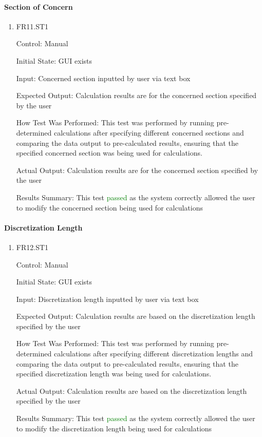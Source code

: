 \documentclass[12pt, titlepage]{article}
\begin{document}
\paragraph{Section of Concern}

\begin{enumerate}

  \item{FR11.ST1\\}

  Control: Manual
            
  Initial State: GUI exists
            
  Input: Concerned section inputted by user via text box
            
  Expected Output: Calculation results are for the concerned section specified by the user
            
  How Test Was Performed: This test was performed by running pre-determined calculations after specifying different concerned sections and comparing the data output to pre-calculated results, ensuring that the specified concerned section was being used for calculations.
					
  Actual Output: Calculation results are for the concerned section specified by the user

  Results Summary: This test \textcolor{green} {passed} as the system correctly allowed the user to modify the concerned section being used for calculations

 \end{enumerate}

\paragraph{Discretization Length}

\begin{enumerate}

  \item{FR12.ST1\\}

  Control: Manual
					
  Initial State: GUI exists
					
  Input: Discretization length inputted by user via text box
					
  Expected Output: Calculation results are based on the discretization length specified by the user

  How Test Was Performed: This test was performed by running pre-determined calculations after specifying different discretization lengths and comparing the data output to pre-calculated results, ensuring that the specified discretization length was being used for calculations. 

  Actual Output: Calculation results are based on the discretization length specified by the user

  Results Summary: This test \textcolor{green} {passed} as the system correctly allowed the user to modify the discretization length being used for calculations

\end{enumerate}
\end{document}
